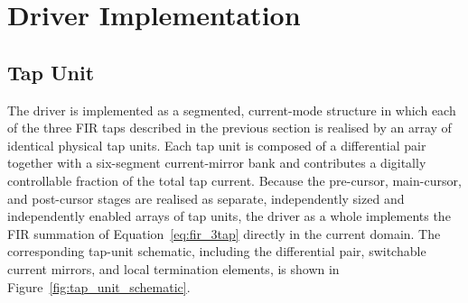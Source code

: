 \section{Driver Implementation} \label{sec:driver_implementation}

\subsection{Tap Unit}

The driver is implemented as a segmented, current-mode structure in which each of the three FIR taps described in the previous section is realised by an array of identical physical tap units. Each tap unit is composed of a differential pair together with a six-segment current-mirror bank and contributes a digitally controllable fraction of the total tap current. Because the pre-cursor, main-cursor, and post-cursor stages are realised as separate, independently sized and independently enabled arrays of tap units, the driver as a whole implements the FIR summation of Equation~\eqref{eq:fir_3tap} directly in the current domain. The corresponding tap-unit schematic, including the differential pair, switchable current mirrors, and local termination elements, is shown in Figure~\ref{fig:tap_unit_schematic}.

